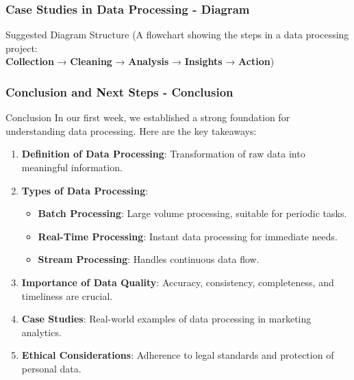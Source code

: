 \documentclass[aspectratio=169]{beamer}
\begin{document}
\begin{frame}[fragile]
    \frametitle{Case Studies in Data Processing - Diagram}
    \begin{block}{Suggested Diagram Structure}
        (A flowchart showing the steps in a data processing project: \\
        \textbf{Collection} → \textbf{Cleaning} → \textbf{Analysis} → \textbf{Insights} → \textbf{Action})
    \end{block}
\end{frame}

\begin{frame}[fragile]
    \frametitle{Conclusion and Next Steps - Conclusion}
    \begin{block}{Conclusion}
        In our first week, we established a strong foundation for understanding data processing. Here are the key takeaways:
    \end{block}
    \begin{enumerate}
        \item \textbf{Definition of Data Processing}: Transformation of raw data into meaningful information.
        \item \textbf{Types of Data Processing}:
        \begin{itemize}
            \item \textbf{Batch Processing}: Large volume processing, suitable for periodic tasks.
            \item \textbf{Real-Time Processing}: Instant data processing for immediate needs.
            \item \textbf{Stream Processing}: Handles continuous data flow.
        \end{itemize}
        \item \textbf{Importance of Data Quality}: Accuracy, consistency, completeness, and timeliness are crucial.
        \item \textbf{Case Studies}: Real-world examples of data processing in marketing analytics.
        \item \textbf{Ethical Considerations}: Adherence to legal standards and protection of personal data.
    \end{enumerate}
\end{frame}
\end{document}
